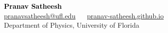 \documentclass[margin, centered]{res}
\begin{document}
\begin{center}
    \hspace{-\hoffset}
    \vspace{3mm}
    \huge {\textcolor{black}{\textbf{Pranav Satheesh}}}\\
    
    \hspace{-\hoffset}
    \large \href{mailto:pranavsatheesh@ufl.edu}{pranavsatheesh@ufl.edu} ~\textbullet~ \href{https://pranav-satheesh.github.io/}{pranav-satheesh.github.io} \\
    \hspace{-\hoffset}
    Department of Physics, University of Florida
\end{center}
\end{document}
